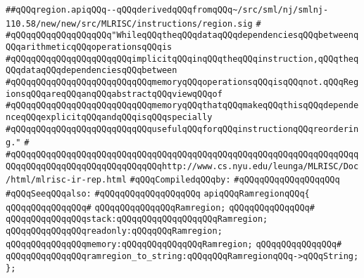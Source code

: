 \label{src/lib/compiler/back/low/code/ramregion.api}
\verb|##qQQqregion.apiqQQq--qQQqderivedqQQqfromqQQq~/src/sml/nj/smlnj-110.58/new/new/src/MLRISC/instructions/region.sig|\newline
\verb|#|\newline
\verb|#qQQqqQQqqQQqqQQqqQQq"WhileqQQqtheqQQqdataqQQqdependenciesqQQqbetweenqQQqarithmeticqQQqoperationsqQQqis|\newline
\verb|#qQQqqQQqqQQqqQQqqQQqqQQqimplicitqQQqinqQQqtheqQQqinstruction,qQQqtheqQQqdataqQQqdependenciesqQQqbetween|\newline
\verb|#qQQqqQQqqQQqqQQqqQQqqQQqqQQqmemoryqQQqoperationsqQQqisqQQqnot.qQQqRegionsqQQqareqQQqanqQQqabstractqQQqviewqQQqof|\newline
\verb|#qQQqqQQqqQQqqQQqqQQqqQQqqQQqmemoryqQQqthatqQQqmakeqQQqthisqQQqdependenceqQQqexplicitqQQqandqQQqisqQQqspecially|\newline
\verb|#qQQqqQQqqQQqqQQqqQQqqQQqqQQqusefulqQQqforqQQqinstructionqQQqreordering."|\newline
\verb|#|\newline
\verb|#qQQqqQQqqQQqqQQqqQQqqQQqqQQqqQQqqQQqqQQqqQQqqQQqqQQqqQQqqQQqqQQqqQQqqQQqqQQqqQQqqQQqqQQqqQQqqQQqqQQqhttp://www.cs.nyu.edu/leunga/MLRISC/Doc/html/mlrisc-ir-rep.html|\newline
\newline
\verb|#qQQqCompiledqQQqby:|\newline
\verb|#qQQqqQQqqQQqqQQqqQQq|\newline
\newline
\verb|#qQQqSeeqQQqalso:|\newline
\verb|#qQQqqQQqqQQqqQQqqQQq|\newline
\newline
\verb|apiqQQqRamregionqQQq{|\newline
\verb|qQQqqQQqqQQqqQQq#|\newline
\verb|qQQqqQQqqQQqqQQqRamregion;|\newline
\verb|qQQqqQQqqQQqqQQq#|\newline
\verb|qQQqqQQqqQQqqQQqstack:qQQqqQQqqQQqqQQqqQQqRamregion;|\newline
\verb|qQQqqQQqqQQqqQQqreadonly:qQQqqQQqRamregion;|\newline
\verb|qQQqqQQqqQQqqQQqmemory:qQQqqQQqqQQqqQQqRamregion;|\newline
\verb|qQQqqQQqqQQqqQQq#|\newline
\verb|qQQqqQQqqQQqqQQqramregion_to_string:qQQqqQQqRamregionqQQq->qQQqString;|\newline
\verb|};|\newline
\newline

